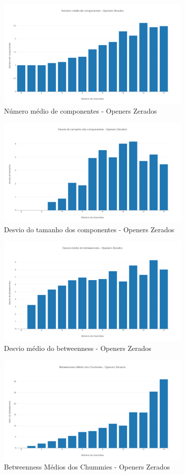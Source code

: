 \documentclass[12pt]{article}
\begin{document}
\begin{figure}[H]
	\centering
	\includegraphics[width=\textwidth, height=200px]{basic-bar_12.png}
	\caption{Número médio de componentes - Openers Zerados}
	\label{fig11}
\end{figure}

\begin{figure}[H]
	\centering
	\includegraphics[width=\textwidth, height=200px]{basic-bar_13.png}
	\caption{Desvio do tamanho dos componentes - Openers Zerados}
	\label{fig12}
\end{figure}

\begin{figure}[H]
	\centering
	\includegraphics[width=\textwidth, height=200px]{basic-bar_14.png}
	\caption{Desvio médio do betweenness - Openers Zerados}
	\label{fig13}
\end{figure}

\begin{figure}[H]
	\centering
	\includegraphics[width=\textwidth, height=200px]{basic-bar_15.png}
	\caption{Betweenness Médios dos Chummies - Openers Zerados}
	\label{fig14}
\end{figure}


{}


\end{document}
